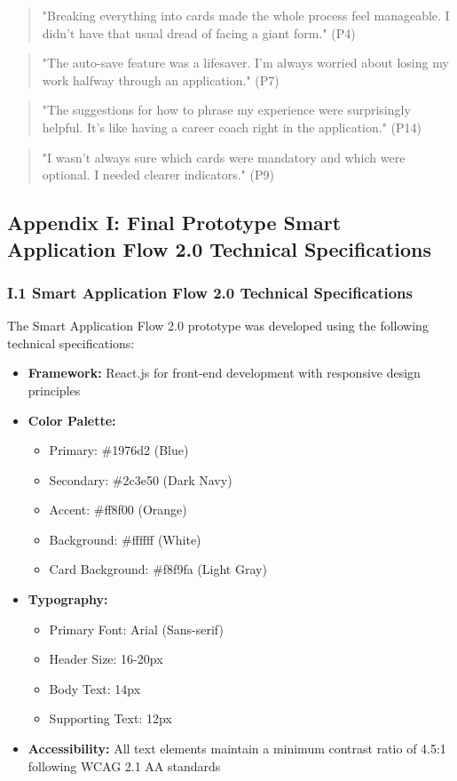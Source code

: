\documentclass[
	letterpaper, %
]{jdf}
\begin{document}
\begin{sloppypar}
\begin{quote}
"Breaking everything into cards made the whole process feel manageable. I didn't have that usual dread of facing a giant form." (P4)
\end{quote}

\begin{quote}
"The auto-save feature was a lifesaver. I'm always worried about losing my work halfway through an application." (P7)
\end{quote}

\begin{quote}
"The suggestions for how to phrase my experience were surprisingly helpful. It's like having a career coach right in the application." (P14)
\end{quote}

\begin{quote}
"I wasn't always sure which cards were mandatory and which were optional. I needed clearer indicators." (P9)
\end{quote}

\newpage
\subsection{Appendix I: Final Prototype Smart Application Flow 2.0 Technical Specifications}
\subsubsection{I.1 Smart Application Flow 2.0 Technical Specifications}
The Smart Application Flow 2.0 prototype was developed using the following technical specifications:

\begin{itemize}
    \item \textbf{Framework:} React.js for front-end development with responsive design principles
    \item \textbf{Color Palette:}
    \begin{itemize}
        \item Primary: \#1976d2 (Blue)
        \item Secondary: \#2c3e50 (Dark Navy)
        \item Accent: \#ff8f00 (Orange)
        \item Background: \#ffffff (White)
        \item Card Background: \#f8f9fa (Light Gray)
    \end{itemize}
    \item \textbf{Typography:}
    \begin{itemize}
        \item Primary Font: Arial (Sans-serif)
        \item Header Size: 16-20px
        \item Body Text: 14px
        \item Supporting Text: 12px
    \end{itemize}
    \item \textbf{Accessibility:} All text elements maintain a minimum contrast ratio of 4.5:1 following WCAG 2.1 AA standards
\end{itemize}


\end{sloppypar}
\end{document}

